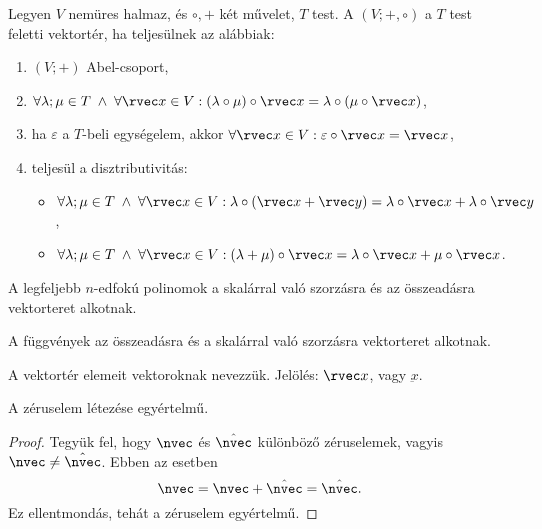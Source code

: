 \begin{definition}[Vektortér]
  Legyen $V$ nemüres halmaz, és $\circ, +$ két művelet, $T$ test.
  A $(V; +, \circ)$ a $T$ test feletti vektortér, ha teljesülnek az alábbiak:
  \begin{enumerate}
    \item $(V; +)$ Abel-csoport,

    \item $\forall \lambda; \mu \in T \; \land \; \forall \rvec x \in V:
            (\lambda \circ \mu) \circ \rvec x
            = \lambda \circ (\mu \circ \rvec x)$,

    \item ha $\varepsilon$ a $T$-beli egységelem, akkor
          $\forall \rvec x \in V: \varepsilon \circ \rvec x = \rvec x$,

    \item teljesül a disztributivitás:
          \begin{itemize}
            \item $\forall \lambda; \mu \in T \; \land \; \forall \rvec x \in V:
                    \lambda \circ (\rvec x + \rvec y)
                    = \lambda \circ \rvec x + \lambda \circ \rvec y$,

            \item $\forall \lambda; \mu \in T \; \land \; \forall \rvec x \in V:
                    (\lambda + \mu) \circ \rvec x
                    = \lambda \circ \rvec x + \mu \circ \rvec x$.
          \end{itemize}
  \end{enumerate}
\end{definition}

\begin{example}
  A legfeljebb $n$-edfokú polinomok a skalárral való szorzásra és az összeadásra
  vektorteret alkotnak.

  A függvények az összeadásra és a skalárral való szorzásra vektorteret alkotnak.
\end{example}

\begin{definition}[Vektor]
  A vektortér elemeit vektoroknak nevezzük.
  Jelölés: $\rvec x$, vagy $\underbar x$.
\end{definition}

\begin{statement}
  A zéruselem létezése egyértelmű.

  \begin{proof}
    Tegyük fel, hogy $\nvec$ és $\hat \nvec$ különböző
    zéruselemek, vagyis $\nvec \neq \hat \nvec$. Ebben az esetben
    $$
      \nvec = \nvec + \hat \nvec = \hat \nvec
      \text.
    $$
    Ez ellentmondás, tehát a zéruselem egyértelmű.
  \end{proof}
\end{statement}

